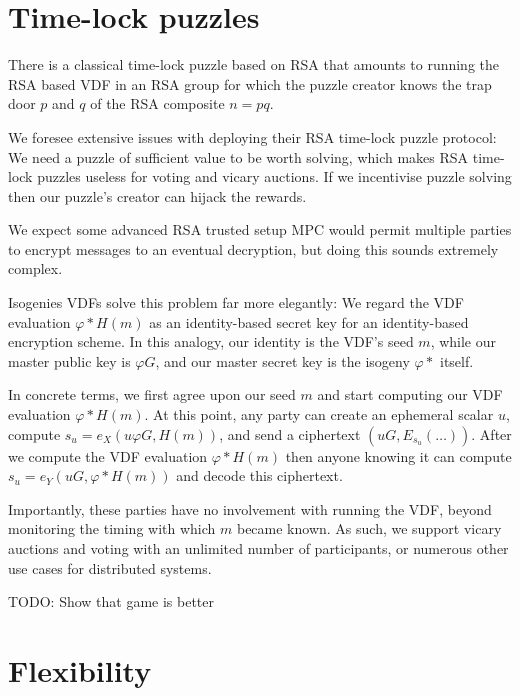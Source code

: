 \documentclass{article}
\begin{document}
\section{Time-lock puzzles}


There is a classical time-lock puzzle based on RSA \cite{TLP} that
amounts to running the RSA based VDF in an RSA group for which the
puzzle creator knows the trap door $p$ and $q$ of the RSA composite
$n = p q$.  

We foresee extensive issues with deploying their RSA time-lock puzzle
protocol:
We need a puzzle of sufficient value to be worth solving, which makes
RSA time-lock puzzles useless for voting and vicary auctions. 
If we incentivise puzzle solving then our puzzle's creator can hijack
the rewards.   

We expect some advanced RSA trusted setup MPC would permit multiple
parties to encrypt messages to an eventual decryption, but doing this
sounds extremely complex.

Isogenies VDFs solve this problem far more elegantly:  We regard the
VDF evaluation $φ* H(m)$ as an identity-based secret key for an
identity-based encryption scheme.  In this analogy, our identity is
the VDF's seed $m$, while our master public key is $φ G$, and
our master secret key is the isogeny $φ*$ itself.

In concrete terms, we first agree upon our seed $m$ and start computing
our VDF evaluation $φ* H(m)$.  At this point, any party can create an
ephemeral scalar $u$, compute $s_u = e_X ( u φ G, H(m) )$, and
send a ciphertext $(u G, E_{s_u}(\ldots))$.
After we compute the VDF evaluation $φ* H(m)$ then anyone knowing it
can compute $s_u = e_Y ( u G, φ* H(m) )$ and decode this ciphertext.

Importantly, these parties have no involvement with running the VDF,
beyond monitoring the timing with which $m$ became known.  As such,
we support vicary auctions and voting with an unlimited number of
participants, or numerous other use cases for distributed systems.


TODO: Show that game is better


\section{Flexibility}
\end{document}
